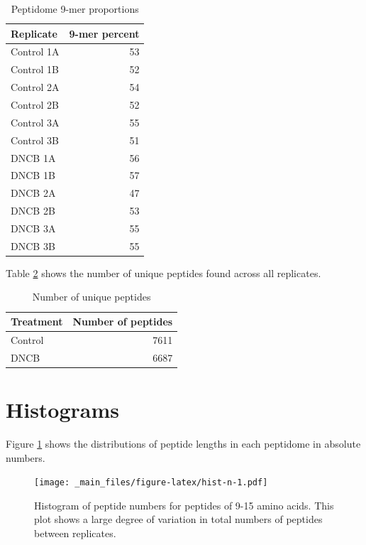 \documentclass[12pt,]{book}
\begin{document}
\begin{table}

\caption{\label{tab:prop-tab}Peptidome 9-mer proportions}
\centering
\begin{tabular}[t]{lr}
\toprule
Replicate & 9-mer percent\\
\midrule
Control 1A & 53\\
Control 1B & 52\\
Control 2A & 54\\
Control 2B & 52\\
Control 3A & 55\\
\addlinespace
Control 3B & 51\\
DNCB 1A & 56\\
DNCB 1B & 57\\
DNCB 2A & 47\\
DNCB 2B & 53\\
\addlinespace
DNCB 3A & 55\\
DNCB 3B & 55\\
\bottomrule
\end{tabular}
\end{table}

Table \ref{tab:unique-peps} shows the number of unique peptides found
across all replicates.

\begin{table}

\caption{\label{tab:unique-peps}Number of unique peptides}
\centering
\begin{tabular}[t]{lr}
\toprule
Treatment & Number of peptides\\
\midrule
Control & 7611\\
DNCB & 6687\\
\bottomrule
\end{tabular}
\end{table}

\section{Histograms}\label{histograms}

Figure \ref{fig:hist-n} shows the distributions of peptide lengths in
each peptidome in absolute numbers.









\begin{figure}
\centering
\texttt{[image: \_main\_files/figure-latex/hist-n-1.pdf]}
\caption{\label{fig:hist-n}Histogram of peptide numbers for peptides of 9-15 amino
acids. This plot shows a large degree of variation in total numbers of
peptides between replicates.}
\end{figure}
\end{document}
